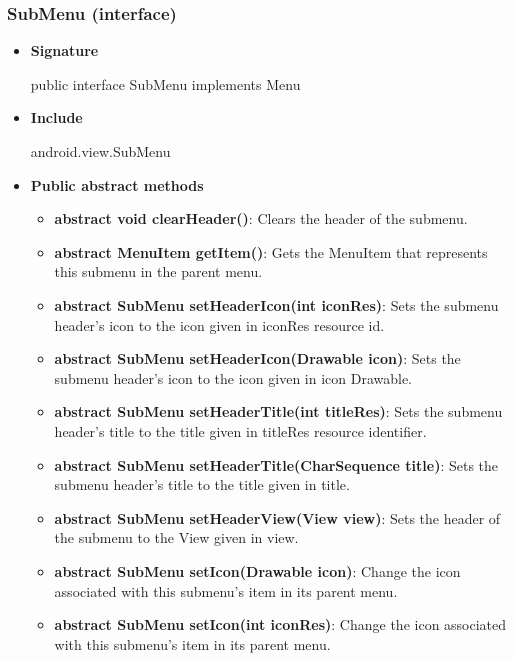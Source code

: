 \documentclass{report}
\begin{document}
\begin{itemize}
\begin{itemize}
    \end{itemize}

    \pagebreak 
    \subsubsection{SubMenu (interface)}
    \begin{itemize}
        \item \textbf{Signature}
            \bigbreak \noindent 
            \begin{javacode}
                public interface SubMenu implements Menu
            \end{javacode}
        \item \textbf{Include}
            \bigbreak \noindent 
            \begin{javacode}
            android.view.SubMenu
            \end{javacode}
        \item \textbf{Public abstract methods}
            \begin{itemize}
                \item \textbf{abstract void	clearHeader()}: Clears the header of the submenu.
                \item \textbf{abstract MenuItem	getItem()}: Gets the MenuItem that represents this submenu in the parent menu.
                \item \textbf{abstract SubMenu	setHeaderIcon(int iconRes)}: Sets the submenu header's icon to the icon given in iconRes resource id.
                \item \textbf{abstract SubMenu	setHeaderIcon(Drawable icon)}: Sets the submenu header's icon to the icon given in icon Drawable.
                \item \textbf{abstract SubMenu	setHeaderTitle(int titleRes)}: Sets the submenu header's title to the title given in titleRes resource identifier.
                \item \textbf{abstract SubMenu	setHeaderTitle(CharSequence title)}: Sets the submenu header's title to the title given in title.
                \item \textbf{abstract SubMenu	setHeaderView(View view)}: Sets the header of the submenu to the View given in view.
                \item \textbf{abstract SubMenu	setIcon(Drawable icon)}: Change the icon associated with this submenu's item in its parent menu.
                \item \textbf{abstract SubMenu	setIcon(int iconRes)}: Change the icon associated with this submenu's item in its parent menu.
            \end{itemize}
    \end{itemize}



\end{itemize}
\end{document}
